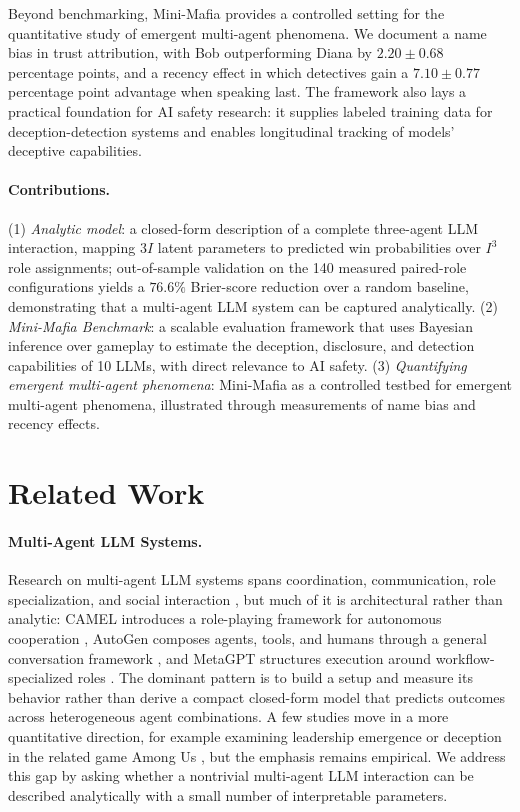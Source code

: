 \documentclass{article}
\begin{document}
Beyond benchmarking, Mini-Mafia provides a controlled setting for the quantitative study of emergent multi-agent phenomena. We document a name bias in trust attribution, with Bob outperforming Diana by $2.20 \pm 0.68$ percentage points, and a recency effect in which detectives gain a $7.10 \pm 0.77$ percentage point advantage when speaking last. The framework also lays a practical foundation for AI safety research: it supplies labeled training data for deception-detection systems and enables longitudinal tracking of models' deceptive capabilities.

\paragraph{Contributions.} (1) \textit{Analytic model}: a closed-form description of a complete three-agent LLM interaction, mapping $3I$ latent parameters to predicted win probabilities over $I^3$ role assignments; out-of-sample validation on the 140 measured paired-role configurations yields a $76.6\%$ Brier-score reduction over a random baseline, demonstrating that a multi-agent LLM system can be captured analytically. (2) \textit{Mini-Mafia Benchmark}: a scalable evaluation framework that uses Bayesian inference over gameplay to estimate the deception, disclosure, and detection capabilities of 10 LLMs, with direct relevance to AI safety. (3) \textit{Quantifying emergent multi-agent phenomena}: Mini-Mafia as a controlled testbed for emergent multi-agent phenomena, illustrated through measurements of name bias and recency effects.



\section{Related Work}
\label{sec:related_work}

\paragraph{Multi-Agent LLM Systems.} Research on multi-agent LLM systems spans coordination, communication, role specialization, and social interaction \citep{gao2024large, guo2024large, wang2024survey, hou2024egosocialarena}, but much of it is architectural rather than analytic: CAMEL introduces a role-playing framework for autonomous cooperation \citep{li2023camel}, AutoGen composes agents, tools, and humans through a general conversation framework \citep{wu2023autogen}, and MetaGPT structures execution around workflow-specialized roles \citep{hong2023metagpt}. The dominant pattern is to build a setup and measure its behavior rather than derive a compact closed-form model that predicts outcomes across heterogeneous agent combinations. A few studies move in a more quantitative direction, for example examining leadership emergence \citep{du2024helmsman} or deception in the related game Among Us \citep{bansal2025amonus}, but the emphasis remains empirical. We address this gap by asking whether a nontrivial multi-agent LLM interaction can be described analytically with a small number of interpretable parameters.
\end{document}
